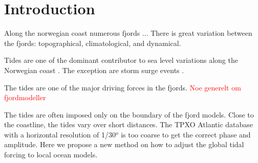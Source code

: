 \section{Introduction}

Along the norwegian coast numerous fjords ... 
There is great variation between the fjords: topographical, climatological, and dynamical.


Tides are one of the dominant contributor to sea level variations along the Norwegian coast \cite[]{grabbe09}. The exception are storm surge events \cite[]{lynge13}.

The tides are one of the major driving forces in the fjords. \textcolor{Red}{Noe generelt om fjordmodeller}

The tides are often imposed only on the boundary of the fjord models. Close to the coastline, the tides vary over short distances. The TPXO Atlantic database with a horizontal resolution of 1/30$^o$ \cite[]{egbert94,egbert02} is too coarse to get the correct phase and amplitude. Here we propose a new method on how to adjust the global tidal forcing to local ocean models. 
